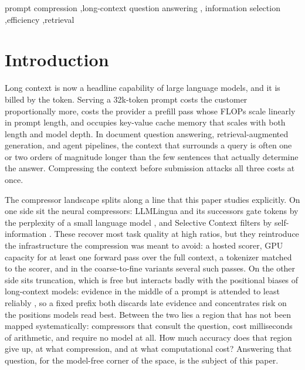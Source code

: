 \documentclass[preprint,12pt]{elsarticle}
\theoremstyle{remark}
\begin{document}
\begin{frontmatter}
\begin{keyword}
prompt compression \sep long-context question answering \sep
information selection \sep efficiency \sep retrieval
\end{keyword}

\end{frontmatter}

\section{Introduction}
\label{sec:intro}

Long context is now a headline capability of large language models, and
it is billed by the token. Serving a 32k-token prompt costs the customer
proportionally more, costs the provider a prefill pass whose FLOPs scale
linearly in prompt length, and occupies key-value cache memory that
scales with both length and model depth. In document question
answering, retrieval-augmented generation, and agent pipelines, the
context that surrounds a query is often one or two orders of magnitude
longer than the few sentences that actually determine the answer.
Compressing the context before submission attacks all three costs at
once.

The compressor landscape splits along a line that this paper studies
explicitly. On one side sit the neural compressors: LLMLingua and its
successors gate tokens by the perplexity of a small language model
\citep{jiang2023llmlingua,jiang2023longllmlingua,pan2024llmlingua2},
and Selective Context filters by self-information
\citep{li2023selective}. These recover most task quality at high
ratios, but they reintroduce the infrastructure the compression was
meant to avoid: a hosted scorer, GPU capacity for at least one forward
pass over the full context, a tokenizer matched to the scorer, and in
the coarse-to-fine variants several such passes. On the other side sits
truncation, which is free but interacts badly with the positional
biases of long-context models: evidence in the middle of a prompt is
attended to least reliably \citep{liu2023lost}, so a fixed prefix both
discards late evidence and concentrates risk on the positions models
read best. Between the two lies a region that has not been mapped
systematically: compressors that consult the question, cost
milliseconds of arithmetic, and require no model at all. How much
accuracy does that region give up, at what compression, and at what
computational cost? Answering that question, for the model-free corner
of the space, is the subject of this paper.
\end{document}
